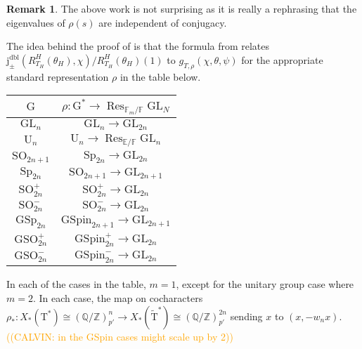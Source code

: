 \documentclass[12pt, reqno]{amsart}
\theoremstyle{definition}
\theoremstyle{definition}
\newtheorem{remark}[theorem]{Remark}
\theoremstyle{definition}
\newcommand{\GL}{\mathrm{GL}}
\newcommand{\SO}{\mathrm{SO}}
\newcommand{\GSO}{\mathrm{GSO}}
\newcommand{\Sp}{\mathrm{Sp}}
\newcommand{\GSp}{\mathrm{GSp}}
\newcommand{\UnitaryGroup}{\mathrm{U}}
\newcommand{\aFieldNorm}{\mathrm{N}}
\newcommand{\finiteField}{\mathbb{F}}
\newcommand{\quadraticExtension}{\mathbb{E}}
\newcommand{\finiteFieldExtension}[1]{\finiteField_{#1}}
\newcommand{\NormOneGroup}[1]{\finiteFieldExtension{#1}^{\aFieldNorm = 1}}
\newcommand{\restrictionOfScalars}[3]{\operatorname{Res}_{#1 \slash #2}{#3}}
\newcommand{\dblVirtualJacobiSumScalar}[2]{\mathrm{j}_{\pm}^{\mathrm{dbl}}\left(#1, #2\right)}
\newcommand{\algebraicGroup}[1]{\boldsymbol{\mathrm{#1}}}
\newcommand{\CocharacterLattice}[1]{X_{\ast}\left(#1\right)}
\newcommand{\RTGTheta}[3]{R_{#1}^{#2}(#3)}
\newcommand{\calvin}[1]{\textcolor{orange}{\sffamily ((CALVIN: #1))}}
\begin{document}
\begin{remark}
	The above work is not surprising as it is really a rephrasing that the eigenvalues of $\rho(s)$ are independent of conjugacy.
\end{remark}

The idea behind the proof of  is that the formula from  relates $\dblVirtualJacobiSumScalar{\RTGTheta{T_H}{H}{\theta_H}}{\chi}/\RTGTheta{T_H}{H}{\theta_H}\left(1\right)$ to $g_{T,\rho}(\chi,\theta,\psi)$ for the appropriate standard representation $\rho$ in the table below. 

\begin{center}
	\begin{tabular}{|c|c|} \hline
		$\algebraicGroup{G}$ & $\rho \colon \algebraicGroup{G}^{\ast} \to \restrictionOfScalars{\finiteFieldExtension{m}}{\finiteField}{\algebraicGroup{\GL}_N}$  \tabularnewline \hline \hline
		$\algebraicGroup{GL}_n$ &  $\algebraicGroup{\GL}_n \to \algebraicGroup{GL}_{2n}$ \tabularnewline \hline
		$\algebraicGroup{\UnitaryGroup}_{n}$ &  $\algebraicGroup{\UnitaryGroup}_{n} \to \restrictionOfScalars{\quadraticExtension}{\finiteField}{\algebraicGroup{GL}_n}$\tabularnewline \hline		 				 
		$\algebraicGroup{\SO}_{2n+1}$ &$\algebraicGroup{\Sp}_{2n} \to \algebraicGroup{\GL}_{2n}$ \tabularnewline \hline
		$\algebraicGroup{\Sp}_{2n}$  &$\algebraicGroup{\SO}_{2n+1}\to \algebraicGroup{\GL}_{2n+1}$\tabularnewline \hline		 
		$\algebraicGroup{\SO}^{+}_{2n}$ &$\algebraicGroup{\SO}^{+}_{2n}\to \algebraicGroup{\GL}_{2n}$\tabularnewline \hline
		$\algebraicGroup{\SO}^{-}_{2n}$ &$\algebraicGroup{\SO}^{-}_{2n}\to \algebraicGroup{\GL}_{2n}$\tabularnewline \hline
		$\algebraicGroup{\GSp}_{2n}$  &$\algebraicGroup{GSpin}_{2n+1}\to \algebraicGroup{\GL}_{2n+1}$ \tabularnewline \hline
		$\algebraicGroup{\GSO}^{+}_{2n}$ & $\algebraicGroup{GSpin}_{2n}^{+}\to\algebraicGroup{\GL}_{2n}$ \tabularnewline \hline
		$\algebraicGroup{\GSO}^{-}_{2n}$& $\algebraicGroup{GSpin}_{2n}^{-}\to\algebraicGroup{\GL}_{2n}$\tabularnewline \hline
	\end{tabular}
\end{center}
In each of the cases in the table, $m = 1$, except for the unitary group case where $m=2$. In each case, the map on cocharacters $\rho_{\ast}:\CocharacterLattice{\algebraicGroup{T}^{\ast}} \cong (\mathbb{Q}/\mathbb{Z})_{p'}^n \to \CocharacterLattice{\tilde{\algebraicGroup{T}}^{\ast}} \cong (\mathbb{Q}/\mathbb{Z})_{p'}^{2n}$ sending $x$ to $(x,-w_n x)$. \calvin{in the GSpin cases might scale up by 2}
\end{document}

